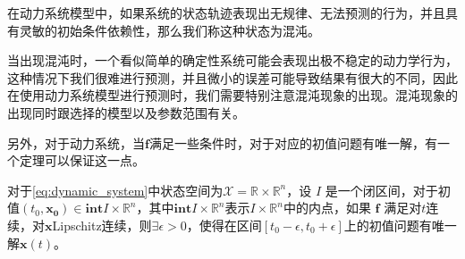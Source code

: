 \begin{defn}[混沌]
    在动力系统模型中，如果系统的状态轨迹表现出无规律、无法预测的行为，并且具有灵敏的初始条件依赖性，那么我们称这种状态为混沌。
\end{defn}

当出现混沌时，一个看似简单的确定性系统可能会表现出极不稳定的动力学行为，这种情况下我们很难进行预测，并且微小的误差可能导致结果有很大的不同，因此在使用动力系统模型进行预测时，我们需要特别注意混沌现象的出现。混沌现象的出现同时跟选择的模型以及参数范围有关。

另外，对于动力系统，当$\mathbf{f}$满足一些条件时，对于对应的初值问题有唯一解，有一个定理可以保证这一点。

\begin{thm}\label{thm:picard_lindelof}
    对于\ref{eq:dynamic_system}中状态空间为$\mathcal{X}=\mathbb{R}\times\mathbb{R}^n$，设 \( I \) 是一个闭区间，对于初值$(t_0,\mathbf{x_0})\in \textbf{int} I\times\mathbb{R}^n$，其中$\textbf{int} I\times\mathbb{R}^n$表示$I\times\mathbb{R}^n$中的内点，如果 $\mathbf{f}$ 满足对$t$连续，对$\mathbf{x}$Lipschitz连续，则$\exists \epsilon>0$，使得在区间$[t_0-\epsilon,t_0+\epsilon]$上的初值问题有唯一解$\mathbf{x}(t)$。
\end{thm}

